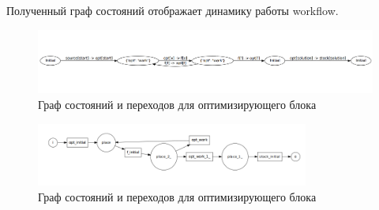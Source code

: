 \documentclass[a4paper,14pt]{article}
\begin{document}
Полученный граф состояний отображает динамику работы workflow.

\begin{figure}[here]
    \centering
    \includegraphics[width=\textwidth]{optimization_state_graph.png}
    \caption{Граф состояний и переходов для оптимизирующего блока }
    \label{img:opt_wf}
\end{figure}

%
%
%


\begin{figure}[here]
    \centering
    \includegraphics[width=0.8\textwidth]{optimization_petri_net.png}
    \caption{Граф состояний и переходов для оптимизирующего блока }
    \label{img:opt_wf}
\end{figure}
\end{document}
